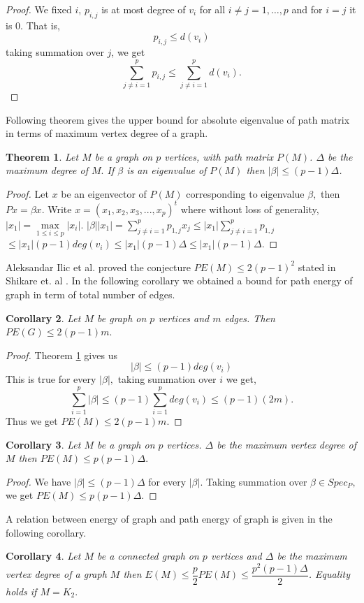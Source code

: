 \documentclass{article}
\newtheorem{theorem}{Theorem}[section]
\newtheorem{corollary}[theorem] {Corollary}
\newtheorem*{open problem*}{Open Problem}
\begin{document}
	\begin{proof}
		We fixed $i$, $p_{i,j}$ is at most degree of $v_i$ for all $i \neq j=1,\dots,p$ and for $i=j$ it is $0.$ That is,\\
		$$ p_{i,j} \leq d(v_i)$$
		taking summation over $j$, we get $$ \sum_{j \neq i=1}^{p} p_{i,j} \leq \sum_{j \neq i=1}^{p} d(v_i).$$ 
	\end{proof}
	Following theorem gives the upper bound for absolute eigenvalue of path matrix in terms of maximum vertex degree of a graph.     
	\begin{theorem} \label{mev}
		Let $M$ be a graph on $p$ vertices, with path matrix $P(M)$. $\Delta$ be the maximum degree of $M.$ If $\beta$ is an eigenvalue of $P(M)$ then $|\beta|\leq (p-1)\Delta$.  
	\end{theorem}
	\begin{proof}
		Let $x$ be an eigenvector of $P(M)$ corresponding to eigenvalue $\beta,$ then $Px=\beta x.$
		Write $x=(x_1, x_2,x_3,...,x_p)^t$ where without loss of generality, $|x_1|=\underset{ 1\leq i \leq p}\max|x_i|.$ 
		$|\beta||x_1|=\displaystyle\sum_{j \neq i=1}^{p} p_{1,j} x_j 
		\leq |x_1|\sum_{j \neq i=1}^{p} p_{1,j}$
		$\leq |x_1| (p-1) deg(v_i)	
		\leq |x_1| (p-1) \Delta
		\leq |x_1| (p-1) \Delta.$ 
	\end{proof}
	Aleksandar Ilic et al. \cite{Aleksandar Ilic}  proved the conjecture $PE(M)\leq 2(p-1)^2$ stated in Shikare et. al \cite{pe1}. In the following corollary we obtained a bound for path energy of graph in term of total number of edges.
	\begin{corollary}
		Let $M$ be graph on $p$ vertices and $m$ edges. Then $PE(G) \leq 2(p-1)m.$
	\end{corollary}
	
	\begin{proof}
		Theorem \ref{mev} gives us  
		\begin{equation}
			|\beta|\leq (p-1)deg(v_i)	 
		\end{equation}
		This is true for every $|\beta|,$ taking summation over $i$ we get,
		\begin{equation}
			\sum_{i=1}^{p} |\beta|\leq (p-1) \sum_{i=1}^{p} deg(v_i) \leq (p-1)(2m).
		\end{equation}
		Thus we get $PE(M) \leq 2(p-1)m.$ 
	\end{proof}
	
	\begin{corollary} \label{enq}	
		Let $M$ be a graph on $p$ vertices. $\Delta$ be the maximum vertex degree of $M$ then $PE(M) \leq p(p-1) \Delta.$
	\end{corollary}
	\begin{proof}
		We have $|\beta|\leq (p-1) \Delta$ for every $|\beta|.$ Taking summation over $\beta \in Spec_P,$ we get $PE(M) \leq p(p-1) \Delta.$    
	\end{proof}
	A relation between energy of graph and path energy of graph is given in the following corollary. 
	\begin{corollary}
		Let $M$ be a connected graph on $p$ vertices and $\Delta$ be the maximum vertex degree of a graph $M$ then $ E(M) \leq \dfrac{p}{2} PE(M) \leq \dfrac{p^2(p-1)\Delta}{2}$. Equality holds if $M=K_2.$  
	\end{corollary}
	
\end{document}
